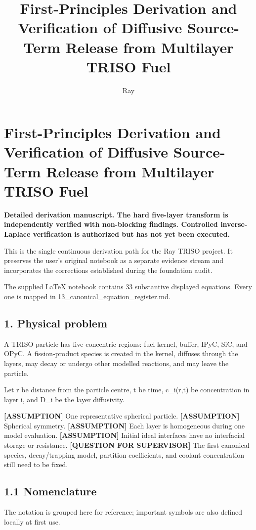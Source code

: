 \documentclass[11pt,a4paper]{article}
\title{First-Principles Derivation and Verification of Diffusive Source-Term Release from Multilayer TRISO Fuel}
\author{Ray}
\date{}
\begin{document}
\maketitle
\section*{First-Principles Derivation and Verification of Diffusive Source-Term Release from Multilayer TRISO Fuel}

\textbf{Detailed derivation manuscript. The hard five-layer transform is independently verified with non-blocking findings. Controlled inverse-Laplace verification is authorized but has not yet been executed.}

This is the single continuous derivation path for the Ray TRISO project. It preserves the user's original notebook as a separate evidence stream and incorporates the corrections established during the foundation audit.

The supplied LaTeX notebook contains 33 substantive displayed equations. Every one is mapped in 13\_canonical\_equation\_register.md.

\subsection*{1. Physical problem}

A TRISO particle has five concentric regions: fuel kernel, buffer, IPyC, SiC, and OPyC. A fission-product species is created in the kernel, diffuses through the layers, may decay or undergo other modelled reactions, and may leave the particle.

Let r be distance from the particle centre, t be time, c\_i(r,t) be concentration in layer i, and D\_i be the layer diffusivity.

\textbf{[ASSUMPTION]} One representative spherical particle.
\textbf{[ASSUMPTION]} Spherical symmetry.
\textbf{[ASSUMPTION]} Each layer is homogeneous during one model evaluation.
\textbf{[ASSUMPTION]} Initial ideal interfaces have no interfacial storage or resistance.
\textbf{[QUESTION FOR SUPERVISOR]} The first canonical species, decay/trapping model, partition coefficients, and coolant concentration still need to be fixed.

\subsection*{1.1 Nomenclature}

The notation is grouped here for reference; important symbols are also defined locally at first use.
\end{document}
